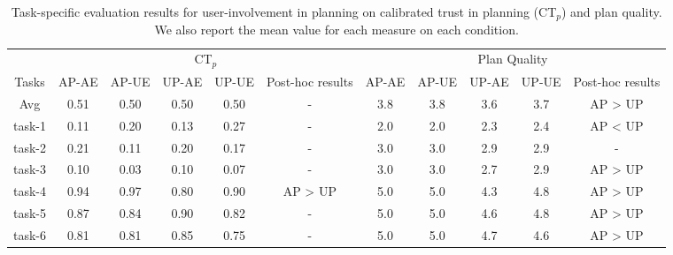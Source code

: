 \begin{table*}[h]
	\centering
	\caption{Task-specific evaluation results for user-involvement in planning on calibrated trust in planning (CT$_p$) and plan quality. We also report the mean value for each measure on each condition.}
	\label{tab:h1-res}
    \begin{small}
	\begin{tabular}{c | c c c  c | c | c  c c c | c}
	    \hline
        &     \multicolumn{5}{c|}{CT$_p$}&  \multicolumn{5}{c}{Plan Quality}\\
        \cline{2-11}
        Tasks& AP-AE& AP-UE& UP-AE& UP-UE& Post-hoc results& AP-AE& AP-UE& UP-AE& UP-UE& Post-hoc results\\
        \hline 
        \hline
        Avg & 0.51& 0.50& 0.50& 0.50& - & 3.8& 3.8& 3.6& 3.7& AP > UP\\
        \hline
        task-1& 0.11 & 0.20 & 0.13 & 0.27& -& 2.0 & 2.0 & 2.3 & 2.4& AP < UP\\
        task-2 &0.21 & 0.11 & 0.20 & 0.17& -& 3.0 & 3.0 & 2.9 & 2.9& -\\
        task-3 & 0.10 & 0.03 & 0.10 & 0.07& -& 3.0 & 3.0 & 2.7 & 2.9& AP > UP\\
        task-4 & 0.94 & 0.97 & 0.80 & 0.90& AP > UP& 5.0 & 5.0 & 4.3 & 4.8& AP > UP\\
        task-5 & 0.87 & 0.84 & 0.90 & 0.82& -& 5.0 & 5.0 & 4.6 & 4.8& AP > UP\\
        task-6 & 0.81 & 0.81 & 0.85 & 0.75& -& 5.0 & 5.0 & 4.7 & 4.6& AP > UP\\
    \hline
	\end{tabular}
 \end{small}
\end{table*}

